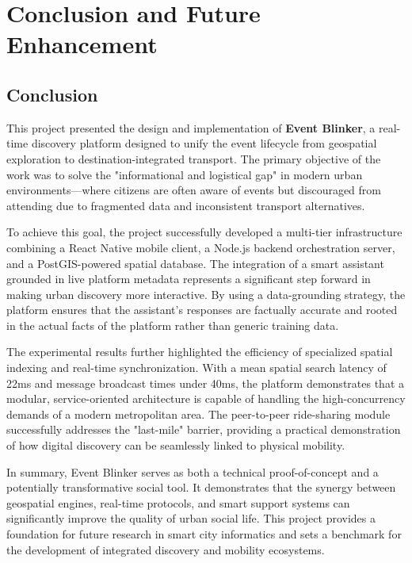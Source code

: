 \chapter{Conclusion and Future Enhancement}

\section{Conclusion}
This project presented the design and implementation of \textbf{Event Blinker}, a real-time discovery platform designed to unify the event lifecycle from geospatial exploration to destination-integrated transport. The primary objective of the work was to solve the "informational and logistical gap" in modern urban environments—where citizens are often aware of events but discouraged from attending due to fragmented data and inconsistent transport alternatives.

To achieve this goal, the project successfully developed a multi-tier infrastructure combining a React Native mobile client, a Node.js backend orchestration server, and a PostGIS-powered spatial database. The integration of a smart assistant grounded in live platform metadata represents a significant step forward in making urban discovery more interactive. By using a data-grounding strategy, the platform ensures that the assistant's responses are factually accurate and rooted in the actual facts of the platform rather than generic training data.

The experimental results further highlighted the efficiency of specialized spatial indexing and real-time synchronization. With a mean spatial search latency of 22ms and message broadcast times under 40ms, the platform demonstrates that a modular, service-oriented architecture is capable of handling the high-concurrency demands of a modern metropolitan area. The peer-to-peer ride-sharing module successfully addresses the "last-mile" barrier, providing a practical demonstration of how digital discovery can be seamlessly linked to physical mobility.

In summary, Event Blinker serves as both a technical proof-of-concept and a potentially transformative social tool. It demonstrates that the synergy between geospatial engines, real-time protocols, and smart support systems can significantly improve the quality of urban social life. This project provides a foundation for future research in smart city informatics and sets a benchmark for the development of integrated discovery and mobility ecosystems.

